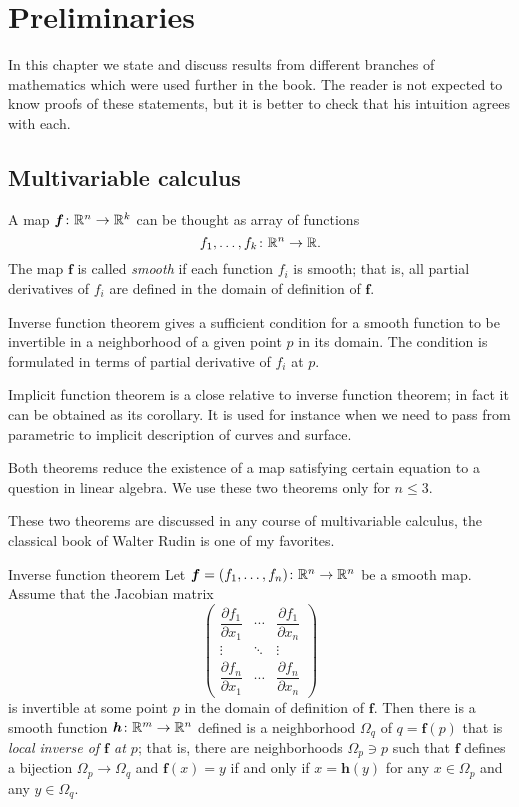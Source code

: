 \chapter{Preliminaries}

In this chapter we state and discuss results from different branches of mathematics which were used further in the book.
The reader is not expected to know proofs of these statements, but it is better to check that his intuition agrees with each.  

\section*{Multivariable calculus}

A map $\bm{f}\colon\mathbb{R}^n\to\mathbb{R}^k$ can be thought as array of functions 
\[f_1,\dots,f_k\colon\mathbb{R}^n\to \mathbb{R}.\]
The map $\bm{f}$ is called \emph{smooth} if each function $f_i$ is smooth;
that is, all partial derivatives of $f_i$ are defined in the domain of definition of $\bm{f}$.

Inverse function theorem gives a sufficient condition for a smooth function to be invertible in a neighborhood of a given point $p$ in its domain.
The condition is formulated in terms of partial derivative of $f_i$ at $p$.

Implicit function theorem is a close relative to inverse function theorem;
in fact it can be obtained as its corollary.
It is used for instance when we need to pass from parametric to implicit description of curves and surface.

Both theorems reduce the existence of a map satisfying certain equation to a question in linear algebra. 
We use these two theorems only for $n\le 3$.

These two theorems are discussed in any course of multivariable calculus, the classical book of Walter Rudin \cite{rudin} is one of my favorites.

\begin{thm}{Inverse function theorem}\label{thm:inverse}
Let $\bm{f}=(f_1,\dots,f_n)\colon\mathbb{R}^n\to\mathbb{R}^n$ be a smooth map.
Assume that the Jacobian matrix
\[
\begin{pmatrix}
\dfrac{\partial f_1}{\partial x_1} & \cdots & \dfrac{\partial f_1}{\partial x_n}\\
\vdots & \ddots & \vdots\\
\dfrac{\partial f_n}{\partial x_1} & \cdots & \dfrac{\partial f_n}{\partial x_n} \end{pmatrix}\]
is invertible at some point $p$ in the domain of definition of $\bm{f}$.
Then there is a smooth function $\bm{h}\colon\mathbb{R}^m\to\mathbb{R}^n$ defined is a neighborhood $\Omega_q$ of $q=\bm{f}(p)$ that is \emph{local inverse of $\bm{f}$ at $p$};
that is, there are neighborhoods $\Omega_p\ni p$ such that
$\bm{f}$ defines a bijection $\Omega_p\to \Omega_q$ and
$\bm{f}(x)=y$ if and only if $x=\bm{h}(y)$ for any $x\in \Omega_p$ and any $y\in \Omega_q$.
\end{thm}

